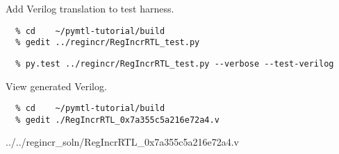 \begin{task}\begin{frame}[fragile]{Add Verilog translation to test harness.}

\begin{verbatim}
  % cd    ~/pymtl-tutorial/build
  % gedit ../regincr/RegIncrRTL_test.py
\end{verbatim}



\begin{verbatim}
  % py.test ../regincr/RegIncrRTL_test.py --verbose --test-verilog
\end{verbatim}

\end{frame}
\end{task}

\begin{task}\begin{frame}[fragile]{View generated Verilog.}
\begin{verbatim}
  % cd    ~/pymtl-tutorial/build
  % gedit ./RegIncrRTL_0x7a355c5a216e72a4.v
\end{verbatim}

%
{../../regincr_soln/RegIncrRTL_0x7a355c5a216e72a4.v}
\end{frame}
\end{task}
